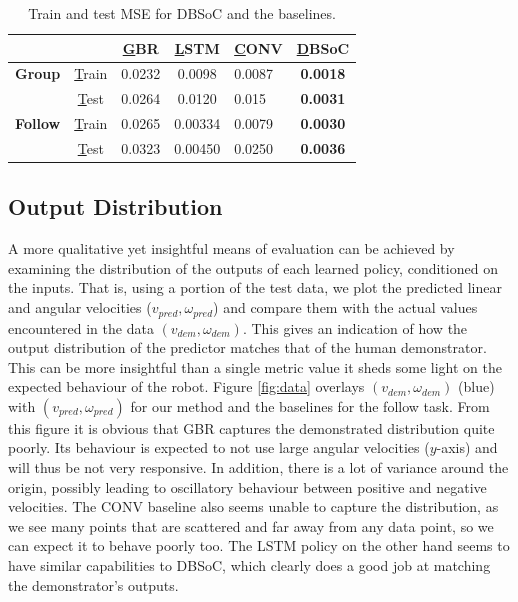 \documentclass[letterpaper, 10 pt, conference]{ieeeconf}
\begin{document}

\begin{table}[h]
\centering

\begin{tabular}{|c|c|c|c|l|c|}
\hline
                &             & {\ul GBR} & {\ul LSTM} & {\ul CONV} & {\ul DBSoC} \\ \hline
\textbf{Group}  & {\ul Train} & 0.0232     & 0.0098      & 0.0087     & \textbf{0.0018}  \\ \hline
                & {\ul Test}  & 0.0264     & 0.0120      & 0.015    & \textbf{0.0031}  \\ \hline
\textbf{Follow} & {\ul Train} & 0.0265    & 0.00334      & 0.0079     & \textbf{0.0030}  \\ \hline
                & {\ul Test}  & 0.0323     & 0.00450       & 0.0250    & \textbf{0.0036}  \\ \hline
\end{tabular}
\caption{Train and test MSE for DBSoC and the baselines.\label{tab:mse}}
\vspace{-3mm}
\end{table}


\subsection{Output Distribution}
A more qualitative yet insightful means of evaluation can be achieved by examining the distribution of the outputs of each learned policy, conditioned on the inputs. That is, using a portion of the test data, we plot the predicted linear and angular velocities ($v_{pred},\omega_{pred}$) and compare them with the actual values encountered in the data $(v_{dem},\omega_{dem})$. This gives an indication of how the output distribution of the predictor matches that of the human demonstrator. This can be more insightful than a single metric value it sheds some light on the expected behaviour of the robot. Figure \ref{fig:data} overlays $(v_{dem},\omega_{dem})$ (blue) with $(v_{pred},\omega_{pred})$ for our method and the baselines for the follow task. From this figure it is obvious that GBR captures the demonstrated distribution quite poorly. Its behaviour is expected to not use large angular velocities ($y$-axis) and will thus be not very responsive. In addition, there is a lot of variance around the origin, possibly leading to oscillatory behaviour between positive and negative velocities. The CONV baseline also seems unable to capture the distribution, as we see many points that are scattered and far away from any data point, so we can expect it to behave poorly too. The LSTM policy on the other hand seems to have similar capabilities to DBSoC, which clearly does a good job at matching the demonstrator's outputs. 
\end{document}
